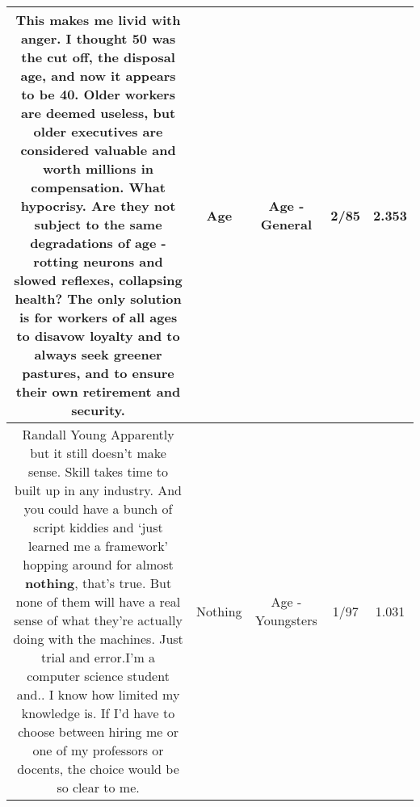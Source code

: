 \documentclass[11pt]{article}
\newlength\mylength
\begin{document}
\begin{center}
\begin{longtable}{|C{.65\mylength}|C{.30\mylength}|C{.12\mylength}|C{.12\mylength}|C{.12\mylength}|}
  \small This makes me livid with anger. I thought 50 was the cut off, the disposal \textbf{age}, and now it appears to be 40. Older workers are deemed useless, but older executives are considered valuable and worth millions in compensation. What hypocrisy. Are they not subject to the same degradations of \textbf{age} - rotting neurons and slowed reflexes, collapsing health? The only solution is for workers of all ages to disavow loyalty and to always seek greener pastures, and to ensure their own retirement and security.\normalsize   & Age & Age - General & 2/85 & 2.353 \\  \hline
  \small Randall Young  Apparently but it still doesn't make sense. Skill takes time to built up in any industry. And you could have a bunch of script kiddies and ‘just learned me a framework' hopping around for almost \textbf{nothing}, that's true. But none of them will have a real sense of what they're actually doing with the machines. Just trial and error.I'm a computer science student and.. I know how limited my knowledge is. If I'd have to choose between hiring me or one of my professors or docents, the choice would be so clear to me.\normalsize   & Nothing & Age - Youngsters & 1/97 & 1.031 \\  \hline

\end{longtable}
\end{center}
\end{document}
